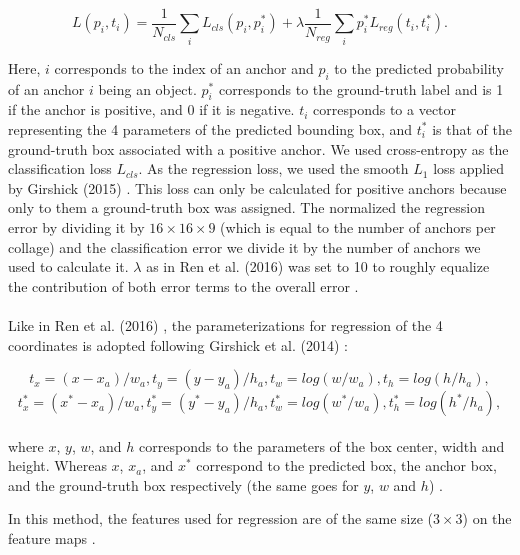 \documentclass[a4paper]{article}
\begin{document}
$$L({p_i},{t_i}) = \frac{1}{N_{cls}} \sum_i L_{cls} (p_i,p_i^*) + \lambda \frac{1}{N_{reg}} \sum_i p_i^* L_{reg} (t_i,t_i^*).$$

\noindent Here, $i$ corresponds to the index of an anchor and $p_i$ to the predicted probability of an anchor $i$ being an object. $p_i^*$ corresponds to the ground-truth label and is 1 if the anchor is positive, and 0 if it is negative. $t_i$ corresponds to a vector representing the 4 parameters of the predicted bounding box, and $t_i^*$ is that of the ground-truth box associated with a positive anchor. We used cross-entropy as the classification loss $L_{cls}$. As the regression loss, we used the smooth $L_1$ loss applied by Girshick (2015) \cite{fastrcnn}. This loss can only be calculated for positive anchors because only to them a ground-truth box was assigned. The normalized the regression error by dividing it by $16 \times 16 \times 9$ (which is equal to the number of anchors per collage) and the classification error we divide it by the number of anchors we used to calculate it. $\lambda$ as in Ren et al. (2016) was set to 10 to roughly equalize the contribution of both error terms to the overall error \cite{fasterrcnn}.
\\
\\
Like in Ren et al. (2016) \cite{fasterrcnn}, the parameterizations for regression of the 4 coordinates is adopted following Girshick et al. (2014) \cite{rcnn}:

$$t_x = (x - x_a)/w_a, t_y = (y - y_a)/h_a, t_w = log(w/w_a), t_h = log(h/h_a),$$
$$t_x^* = (x^* - x_a)/w_a, t_y^* = (y^* - y_a)/h_a, t_w^* = log(w^*/w_a), t_h^* = log(h^*/h_a),$$
\\
where $x$, $y$, $w$, and $h$ corresponds to the parameters of the box center, width and height. Whereas $x$, $x_a$, and $x^*$ correspond to the predicted box, the anchor box, and the ground-truth box respectively (the same goes for $y$, $w$ and $h$) \cite{fasterrcnn}.

In this method, the features used for regression are of the same size ($3 \times 3$) on the feature maps \cite{fasterrcnn}.
\end{document}
